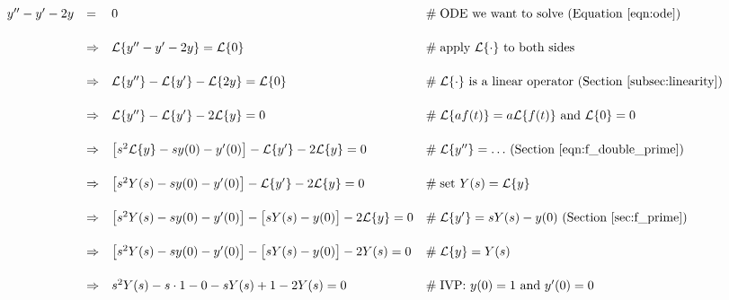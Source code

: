 \documentclass{article}
\theoremstyle{definition}
\begin{document}
\begin{equation*}
\begin{array}{lllll}
y^{\prime \prime} - y^\prime -2y                                                                                     
&=& 0                                                                                                                                                                        &\mathrel{\#} \text{ODE we want to solve (Equation \ref{eqn:ode}})                                                 \\
[15pt]
&\Rightarrow& \mathcal{L}\{y^{\prime \prime} - y^\prime -2y\} = \mathcal{L}\{0\} 
		&\mathrel{\#} \text{apply $\mathcal{L}\{\cdot\}$ to both sides} \\
[15pt]
 &\Rightarrow& \mathcal{L}\{y^{\prime \prime}\} - \mathcal{L}\{y^\prime\} -\mathcal{L}\{2y\}  = \mathcal{L}\{0\}      &\mathrel{\#} \text{$\mathcal{L}\{\cdot\}$ is a linear operator (Section \ref{subsec:linearity})}                                                                                     \\
[15pt]
&\Rightarrow& \mathcal{L}\{y^{\prime \prime}\} - \mathcal{L}\{y^\prime\} - 2\mathcal{L}\{y\}                 = 0             &\mathrel{\#} \text{$\mathcal{L}\{a f(t) \} = a \mathcal{L}\{f(t)\}$ and $\mathcal{L}\{0\} = 0$}             \\
[15pt]
&\Rightarrow& \big [ s^2 \mathcal{L}\{y\} - s y(0) - y^\prime (0) \big ] - \mathcal{L}\{y^\prime\} - 2\mathcal{L}\{y\} = 0   &\mathrel{\#} \text{$\mathcal{L}\{y^{\prime \prime}\} = \hdots$ (Section \ref{eqn:f_double_prime})}  \\
[15pt]
&\Rightarrow& \big [ s^2 Y(s) - s y(0) - y^\prime (0) \big ] - \mathcal{L}\{y^\prime\} - 2\mathcal{L}\{y\} = 0             &\mathrel{\#} \text{set } Y(s) = \mathcal{L}\{y\}                                                                                    \\
[15pt]
&\Rightarrow&  \big [ s^2 Y(s) - s y(0) - y^\prime (0) \big ] - \big [ s Y(s) - y(0) \big ]- 2\mathcal{L}\{y\} = 0             &\mathrel{\#} \text{$\mathcal{L}\{y^\prime\} = sY(s) - y(0)$ (Section \ref{sec:f_prime})}                     \\
[15pt]
&\Rightarrow&  \big [ s^2 Y(s) - s y(0) - y^\prime (0) \big ] - \big [ s Y(s) - y(0) \big ]-  2 Y(s)                 = 0            &\mathrel{\#}  \mathcal{L}\{y\} = Y(s)                                                                                                  \\
[15pt]
&\Rightarrow&  s^2 Y(s) -s \cdot 1 - 0 - sY(s) + 1 - 2 Y(s)                                                                     = 0            &\mathrel{\#} \text{IVP: $y(0) = 1$ and $y^\prime (0) = 0$}                                                                 \\

\end{array}
\end{equation*}
\end{document}
